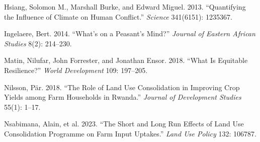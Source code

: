 \documentclass[11pt]{article}
\begin{document}
\noindent Hsiang, Solomon M., Marshall Burke, and Edward Miguel. 2013.
``Quantifying the Influence of Climate on Human Conflict.''
\textit{Science} 341(6151): 1235367.
\vspace{0.2cm}

\noindent Ingelaere, Bert. 2014. ``What's on a Peasant's Mind?''
\textit{Journal of Eastern African Studies} 8(2): 214--230.
\vspace{0.2cm}

\noindent Matin, Nilufar, John Forrester, and Jonathan Ensor. 2018.
``What Is Equitable Resilience?'' \textit{World Development} 109: 197--205.
\vspace{0.2cm}

\noindent Nilsson, P\"{a}r. 2018. ``The Role of Land Use Consolidation in
Improving Crop Yields among Farm Households in Rwanda.''
\textit{Journal of Development Studies} 55(1): 1--17.
\vspace{0.2cm}

\noindent Nsabimana, Alain, et al. 2023. ``The Short and Long Run Effects of
Land Use Consolidation Programme on Farm Input Uptakes.''
\textit{Land Use Policy} 132: 106787.
\end{document}
